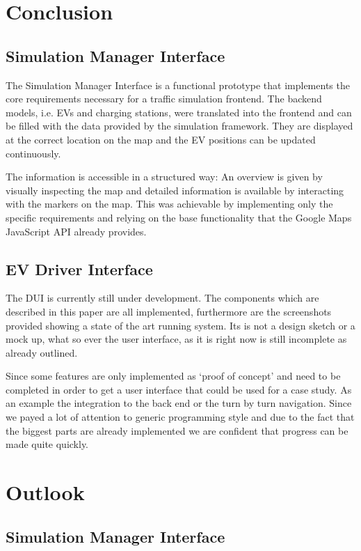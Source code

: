 \section{Conclusion}

\subsection{Simulation Manager Interface}

The Simulation Manager Interface is a functional prototype that implements the core requirements necessary for a traffic simulation frontend. The backend models, i.e. EVs and charging stations, were translated into the frontend and can be filled with the data provided by the simulation framework. They are displayed at the correct location on the map and the EV positions can be updated continuously.

The information is accessible in a structured way: An overview is given by visually inspecting the map and detailed information is available by interacting with the markers on the map. This was achievable by implementing only the specific requirements and relying on the base functionality that the Google Maps JavaScript API already provides.

\subsection{EV Driver Interface}

The DUI is currently still under development. The components which are described in this paper are all implemented, furthermore are the screenshots provided showing a state of the art running system. Its is not a design sketch or a mock up, what so ever the user interface, as it is right now is still incomplete as already outlined.

Since some features are only implemented as ‘proof of concept’ and need to be completed in order to get a user interface that could be used for a case study. As an example the integration to the back end or the turn by turn navigation. Since we payed a lot of attention to generic programming style and due to the fact that the biggest parts are already implemented we are confident that progress can be made quite quickly.


\section{Outlook}

\subsection{Simulation Manager Interface}

